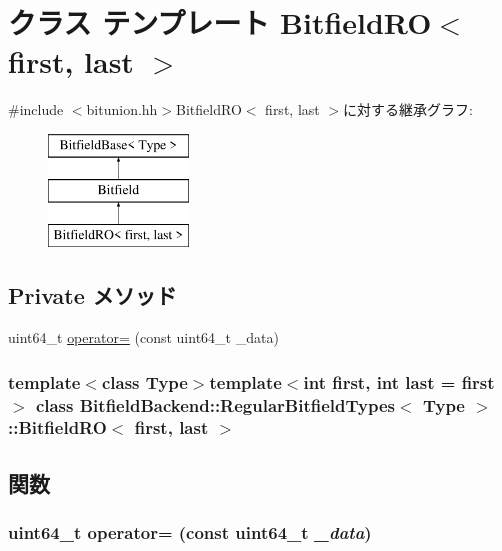 \hypertarget{classBitfieldBackend_1_1RegularBitfieldTypes_1_1BitfieldRO}{
\section{クラス テンプレート BitfieldRO$<$ first, last $>$}
\label{classBitfieldBackend_1_1RegularBitfieldTypes_1_1BitfieldRO}
}


{\ttfamily \#include $<$bitunion.hh$>$}BitfieldRO$<$ first, last $>$に対する継承グラフ:\begin{figure}[H]
\begin{center}
\leavevmode
\includegraphics[height=3cm]{classBitfieldBackend_1_1RegularBitfieldTypes_1_1BitfieldRO}
\end{center}
\end{figure}
\subsection*{Private メソッド}
\begin{DoxyCompactItemize}
\item 
uint64\_\-t \hyperlink{classBitfieldBackend_1_1RegularBitfieldTypes_1_1BitfieldRO_a89ce74f3480b6d588fa6e042d8753675}{operator=} (const uint64\_\-t \_\-data)
\end{DoxyCompactItemize}
\subsubsection*{template$<$class Type$>$template$<$int first, int last = first$>$ class BitfieldBackend::RegularBitfieldTypes$<$ Type $>$::BitfieldRO$<$ first, last $>$}



\subsection{関数}
\hypertarget{classBitfieldBackend_1_1RegularBitfieldTypes_1_1BitfieldRO_a89ce74f3480b6d588fa6e042d8753675}{
\subsubsection[{operator=}]{\setlength{\rightskip}{0pt plus 5cm}uint64\_\-t operator= (const uint64\_\-t {\em \_\-data})}}
\label{classBitfieldBackend_1_1RegularBitfieldTypes_1_1BitfieldRO_a89ce74f3480b6d588fa6e042d8753675}


